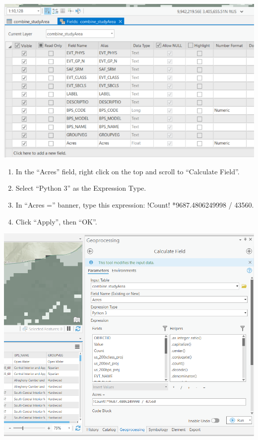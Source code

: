 \documentclass[
]{book}
\providecommand{\tightlist}{%
  \setlength{\itemsep}{0pt}\setlength{\parskip}{0pt}}
\begin{document}
\includegraphics[width=1000px]{04_gis_screenshots/15_fields_view}

\begin{enumerate}
\def\labelenumi{\arabic{enumi}.}
\setcounter{enumi}{2}
\tightlist
\item
  In the ``Acres'' field, right click on the top and scroll to ``Calculate Field''.
\item
  Select ``Python 3'' as the Expression Type.
\item
  In ``Acres ='' banner, type this expression: !Count! *9687.4806249998 / 43560.
\item
  Click ``Apply'', then ``OK''.
\end{enumerate}

\includegraphics[width=1000px]{04_gis_screenshots/16_calculate_acres}
\end{document}
